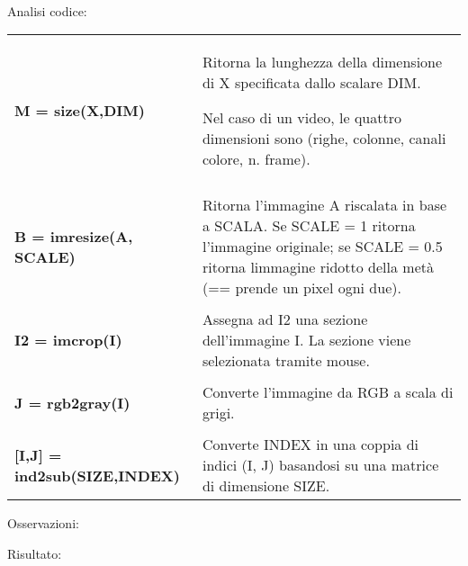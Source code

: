 \documentclass[a4paper, 10pt]{report}
\begin{document}
\noindent \\Analisi codice:
\begin{longtable}{| p{} | p{} |}

\textbf{M = size(X,DIM)} & Ritorna la lunghezza della dimensione di X specificata dallo scalare DIM.

Nel caso di un video, le quattro dimensioni sono (righe, colonne, canali colore, n. frame).
\\\\
\textbf{B = imresize(A, SCALE)} & Ritorna l'immagine A riscalata in base a SCALA.
Se SCALE = 1 ritorna l'immagine originale; se SCALE = 0.5 ritorna limmagine ridotto della metà (== prende un pixel ogni due).
\\\\
\textbf{I2 = imcrop(I)} & Assegna ad I2 una sezione dell'immagine I. La sezione viene selezionata tramite mouse.
\\\\
\textbf{J = rgb2gray(I)} & Converte l'immagine da RGB a scala di grigi.
\\\\
\textbf{[I,J] = ind2sub(SIZE,INDEX)} & Converte INDEX in una coppia di indici (I, J) basandosi su una matrice di dimensione SIZE. 

\end{longtable}

\noindent Osservazioni:

\noindent Risultato:
\end{document}
